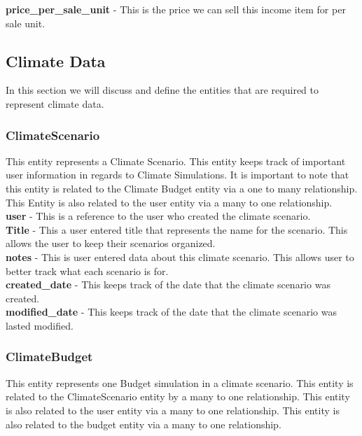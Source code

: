 \documentclass[onecolumn, draftclsnofoot,10pt, compsoc]{article}
\begin{document}
					\textbf{price\_per\_sale\_unit} - This is the price we can sell this income item for per sale unit.\\
		
		\subsection{Climate Data}
			In this section we will discuss and define the entities that are required to represent climate data.\\
				\subsubsection{ClimateScenario}
					This entity represents a Climate Scenario. This entity keeps track of important user information in regards to Climate Simulations. It is important to note that this entity is related to the Climate Budget entity via a one to many relationship. This Entity is also related to the user entity via a many to one relationship.\\
					
					\textbf{user} - This is a reference to the user who created the climate scenario.\\
					
					\textbf{Title} - This a user entered title that represents the name for the scenario. This allows the user to keep their scenarios organized.\\
					
					\textbf{notes} - This is user entered data about this climate scenario. This allows user to better track what each scenario is for.\\
					
					\textbf{created\_date} - This keeps track of the date that the climate scenario was created.\\
					
					\textbf{modified\_date} - This keeps track of the date that the climate scenario was lasted modified.\\
				
				\subsubsection{ClimateBudget}
					This entity represents one Budget simulation in a climate scenario. This entity is related to the ClimateScenario entity by a many to one relationship. This entity is also related to the user entity via a many to one relationship. This entity is also related to the budget entity via a many to one relationship.\\
				
\end{document}
